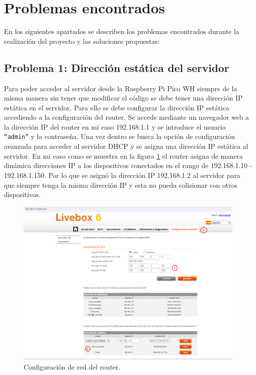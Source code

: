 \documentclass{article}
\begin{document}
\section{Problemas encontrados}
En los siguientes apartados se describen los problemas encontrados durante la realización del proyecto y las soluciones propuestas:
\subsection{Problema 1: Dirección estática del servidor} 
Para poder acceder al servidor desde la Raspberry Pi Pico WH siempre de la misma manera sin tener que modificar el código se debe tener una dirección IP estática en el servidor. Para ello se debe configurar la dirección IP estática accediendo a la configuración del router.
Se accede mediante un navegador web a la dirección IP del router en mi caso 192.168.1.1 y se introduce el usuario \texttt{``admin''} y la contraseña. Una vez dentro se busca la opción de configuración avanzada para acceder al servidor DHCP y se asigna una dirección IP estática al servidor.
En mi caso como se muestra en la figura \ref{fig:configuracion router} el router asigna de manera dinámica direcciones IP a los dispositivos conectados en el rango de 192.168.1.10 - 192.168.1.150. Por lo que se asignó la dirección IP 192.168.1.2 al servidor para que siempre tenga la misma dirección IP y esta no pueda colisionar con otros dispositivos.
\begin{figure}[H]
	\raggedright
	\includegraphics[width=1\linewidth]{../images/router_config.png}
	\caption{\label{fig:configuracion router}Configuración de red del router.}
\end{figure}
\end{document}
